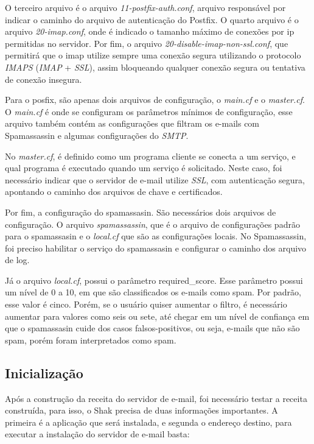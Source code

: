 O terceiro arquivo é o arquivo \textit{11-postfix-auth.conf}, arquivo responsável por 
indicar o caminho do arquivo de autenticação
do Postfix. O quarto arquivo é o arquivo \textit{20-imap.conf}, onde é indicado o tamanho
máximo de conexões por ip permitidas no servidor. Por fim, o arquivo
\textit{20-disable-imap-non-ssl.conf}, que permitirá que o imap utilize sempre uma conexão
segura utilizando o protocolo \textit{IMAPS} (\textit{IMAP} + \textit{SSL}), assim bloqueando 
qualquer conexão segura ou tentativa de conexão insegura.

Para o posfix, são apenas dois arquivos de configuração, o \textit{main.cf} e o 
\textit{master.cf}.
O \textit{main.cf} é onde se configuram os parâmetros mínimos de configuração, esse arquivo
também contém as configurações que filtram os e-mails com Spamassassin e 
algumas configurações do \textit{SMTP}. 

No \textit{master.cf}, é definido como um programa cliente se conecta a um serviço, e qual
programa é executado quando um serviço é solicitado. Neste caso, foi necessário
indicar que o servidor de e-mail utilize \textit{SSL}, com autenticação segura, 
apontando o caminho dos arquivos de chave e certificados.

Por fim, a configuração do spamassasin. São necessários dois arquivos de configuração.
O arquivo \textit{spamassassin}, que é o arquivo de configurações padrão para o spamassasin e o
\textit{local.cf} que são as configurações locais. No Spamassassin, foi preciso habilitar 
o serviço do spamassasin e configurar o caminho dos arquivo de log.

Já o arquivo \textit{local.cf}, possui o parâmetro required\_score. Esse parâmetro 
possui um nível de 0 a 10, em que 
são classificados os e-mails como spam. Por padrão, esse valor é cinco. Porém, se 
o usuário quiser aumentar o filtro, é necessário aumentar para valores como seis ou sete, 
até chegar em um nível de confiança em que o spamassasin cuide dos casos falsos-positivos, 
ou seja, e-mails que não são spam, porém foram interpretados como spam.

\subsection{Inicialização}

Após a construção da receita do servidor de e-mail, foi necessário testar a receita construída,
para isso, o Shak precisa de duas informações importantes. A primeira é a aplicação
que será instalada, e segunda o endereço destino, para executar a instalação
do servidor de e-mail basta:

